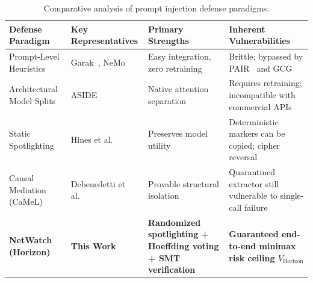 \begin{table}[htbp]
\centering
\small
\caption{Comparative analysis of prompt injection defense paradigms.}
\label{tab:related_work_comparison}
\begin{tabular}{@{}p{3.5cm} p{3.2cm} p{3.5cm} p{3.8cm}@{}}
\toprule
\textbf{Defense Paradigm} & \textbf{Key Representatives} & \textbf{Primary Strengths} & \textbf{Inherent Vulnerabilities} \\
\midrule
Prompt-Level Heuristics & Garak~\cite{garak2024}, NeMo~\cite{rebedea2023nemo} & Easy integration, zero retraining & Brittle; bypassed by PAIR~\cite{chao2023pair} and GCG~\cite{zou2023gcg} \\
Architectural Model Splits & ASIDE~\cite{zverev2026aside} & Native attention separation & Requires retraining; incompatible with commercial APIs \\
Static Spotlighting & Hines et al.~\cite{hines2024spotlighting} & Preserves model utility & Deterministic markers can be copied; cipher reversal \\
Causal Mediation (CaMeL) & Debenedetti et al.~\cite{debenedetti2025camel} & Provable structural isolation & Quarantined extractor still vulnerable to single-call failure \\
\textbf{NetWatch (Horizon)} & \textbf{This Work} & \textbf{Randomized spotlighting + Hoeffding voting + SMT verification} & \textbf{Guaranteed end-to-end minimax risk ceiling $V_{\mathrm{Horizon}}$} \\
\bottomrule
\end{tabular}
\end{table}
